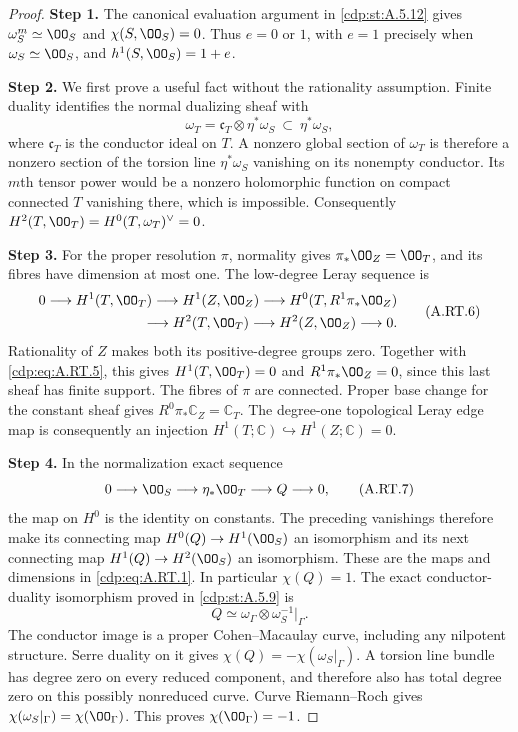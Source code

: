 \begin{proof}
\noindent\textbf{Step 1.} The canonical evaluation argument in \ref{cdp:st:A.5.12} gives
$\omega_S^m\simeq\OO_S$ and $\chi(S,\OO_S)=0$.
Thus $e=0$ or $1$, with $e=1$ precisely when
$\omega_S\simeq\OO_S$, and
$h^1(S,\OO_S)=1+e$.

\noindent\textbf{Step 2.} We first prove a useful fact without the rationality assumption.
Finite duality identifies the normal dualizing sheaf with
\[
 \omega_T=\mathfrak c_T\otimes\eta^*\omega_S
       \ \subset\ \eta^*\omega_S,
\tag{A.RT.5}\label{cdp:eq:A.RT.5}
\]
where $\mathfrak c_T$ is the conductor ideal on $T$.
A nonzero global section of $\omega_T$ is therefore a nonzero
section of the torsion line $\eta^*\omega_S$ vanishing on its
nonempty conductor. Its $m$th tensor power would be a nonzero
holomorphic function on compact connected $T$ vanishing there,
which is impossible. Consequently
$H^2(T,\OO_T)=H^0(T,\omega_T)^\vee=0$.

\noindent\textbf{Step 3.} For the proper resolution $\pi$, normality gives
$\pi_*\OO_Z=\OO_T$, and its fibres have dimension at most one.
The low-degree Leray sequence is
\[
\begin{split}
0\longrightarrow H^1(T,\OO_T)\longrightarrow H^1(Z,\OO_Z)
 \longrightarrow H^0(T,R^1\pi_*\OO_Z)\\
 \longrightarrow H^2(T,\OO_T)\longrightarrow H^2(Z,\OO_Z)
 \longrightarrow0.
\end{split}
\tag{A.RT.6}\label{cdp:eq:A.RT.6}
\]
Rationality of $Z$ makes both its positive-degree groups zero.
Together with \eqref{cdp:eq:A.RT.5}, this gives $H^1(T,\OO_T)=0$ and
$R^1\pi_*\OO_Z=0$, since this last sheaf has finite support.
The fibres of $\pi$ are connected. Proper base change for the
constant sheaf gives $R^0\pi_*\mathbb C_Z=\mathbb C_T$.
The degree-one topological Leray edge map is consequently an
injection $H^1(T;\mathbb C)\hookrightarrow H^1(Z;\mathbb C)=0$.

\noindent\textbf{Step 4.} In the normalization exact sequence
\[
 0\longrightarrow\OO_S\longrightarrow\eta_*\OO_T
       \longrightarrow Q\longrightarrow0,
\tag{A.RT.7}\label{cdp:eq:A.RT.7}
\]
the map on $H^0$ is the identity on constants. The preceding
vanishings therefore make its connecting map
$H^0(Q)\to H^1(\OO_S)$ an isomorphism and its next connecting
map $H^1(Q)\to H^2(\OO_S)$ an isomorphism. These are the
maps and dimensions in \eqref{cdp:eq:A.RT.1}. In particular $\chi(Q)=1$.
The exact conductor-duality isomorphism proved in \ref{cdp:st:A.5.9} is
\[
 Q\simeq\omega_\Gamma\otimes\omega_S^{-1}|_\Gamma.
\tag{A.RT.8}\label{cdp:eq:A.RT.8}
\]
The conductor image is a proper Cohen--Macaulay curve, including
any nilpotent structure. Serre duality on it gives
$\chi(Q)=-\chi(\omega_S|_\Gamma)$. A torsion line bundle has
degree zero on every reduced component, and therefore also has
total degree zero on this possibly nonreduced curve. Curve
Riemann--Roch gives
$\chi(\omega_S|_\Gamma)=\chi(\OO_\Gamma)$.
This proves $\chi(\OO_\Gamma)=-1$.


\end{proof}

